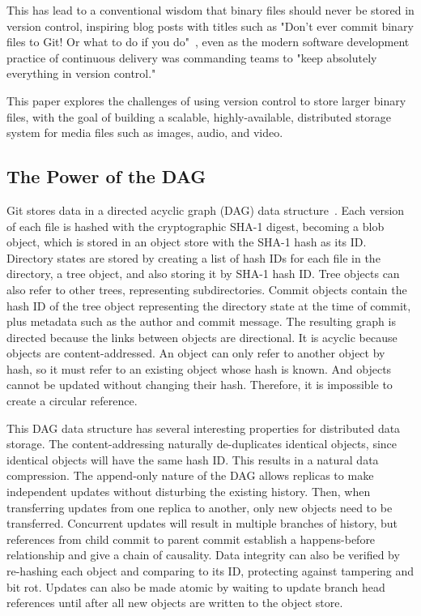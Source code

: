 This has lead to a conventional wisdom that binary files should never be stored in version control, inspiring blog posts with titles such as
"Don't ever commit binary files to Git! Or what to do if you do"~\cite{dont_ever_commit_binaries_to_version_control},
even as the modern software development practice of continuous delivery was commanding teams to "keep absolutely everything in version control."~\cite[p.33]{continuousdeliverybook}


This paper explores the challenges of using version control to store larger binary files, with the goal of building a scalable, highly-available, distributed storage system for media files such as images, audio, and video.

\subsection{The Power of the DAG}

Git stores data in a directed acyclic graph (DAG) data structure~\cite{git_initial_readme}.
Each version of each file is hashed with the cryptographic SHA-1 digest, becoming a blob object, which is stored in an object store with the SHA-1 hash as its ID.
Directory states are stored by creating a list of hash IDs for each file in the directory, a tree object, and also storing it by SHA-1 hash ID.
Tree objects can also refer to other trees, representing subdirectories.
Commit objects contain the hash ID of the tree object representing the directory state at the time of commit, plus metadata such as the author and commit message.
The resulting graph is directed because the links between objects are directional.
It is acyclic because objects are content-addressed.
An object can only refer to another object by hash, so it must refer to an existing object whose hash is known.
And objects cannot be updated without changing their hash.
Therefore, it is impossible to create a circular reference.

This DAG data structure has several interesting properties for distributed data storage.
The content-addressing naturally de-duplicates identical objects, since identical objects will have the same hash ID.
This results in a natural data compression.
The append-only nature of the DAG allows replicas to make independent updates without disturbing the existing history.
Then, when transferring updates from one replica to another, only new objects need to be transferred.
Concurrent updates will result in multiple branches of history, but references from child commit to parent commit establish a happens-before relationship and give a chain of causality.
Data integrity can also be verified by re-hashing each object and comparing to its ID, protecting against tampering and bit rot.
Updates can also be made atomic by waiting to update branch head references until after all new objects are written to the object store.

